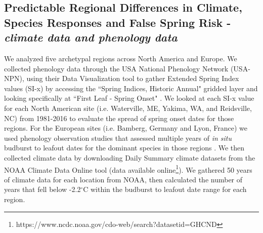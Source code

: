 \documentclass{article}\usepackage[]{graphicx}\usepackage[]{color}
\begin{document}
\subsection*{Predictable Regional Differences in Climate, Species Responses and False Spring Risk - \textit{climate data and phenology data}}
We analyzed five archetypal regions across North America and Europe. We collected phenology data through the USA National Phenology Network (USA-NPN), using their Data Visualization tool to gather Extended Spring Index values (SI-x) by accessing the ``Spring Indices, Historic Annual" gridded layer and looking specifically at ``First Leaf - Spring Onset" \citep{SI-x2016}. We looked at each SI-x value for each North American site (i.e. Waterville, ME, Yakima, WA, and Reidsville, NC) from 1981-2016 to evaluate the spread of spring onset dates for those regions. For the European sites (i.e. Bamberg, Germany and Lyon, France) we used phenology observation studies that assessed multiple years of \textit{in situ} budburst to leafout dates for the dominant species in those regions \citep{Soudani2012, White2009,Schaber2005}. We then collected climate data by downloading Daily Summary climate datasets from the NOAA Climate Data Online tool (data available online\footnote{https://www.ncdc.noaa.gov/cdo-web/search?datasetid=GHCND}). We gathered 50 years of climate data for each location from NOAA, then calculated the number of years that fell below -2.2$^{\circ}$C within the budburst to leafout date range for each region. %

\newpage
\end{document}
